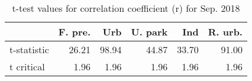 \begin{table}
\centering
\caption{t-test values for correlation coefficient (r) for Sep. 2018}
\label{tab: r_sign}
\begin{tabular}{lrrrrr}
\toprule
{} &  F. pre. &    Urb &  U. park &    Ind &  R. urb. \\
\midrule
t-statistic &    26.21 &  98.94 &    44.87 &  33.70 &    91.00 \\
t critical  &     1.96 &   1.96 &     1.96 &   1.96 &     1.96 \\
\bottomrule
\end{tabular}
\end{table}